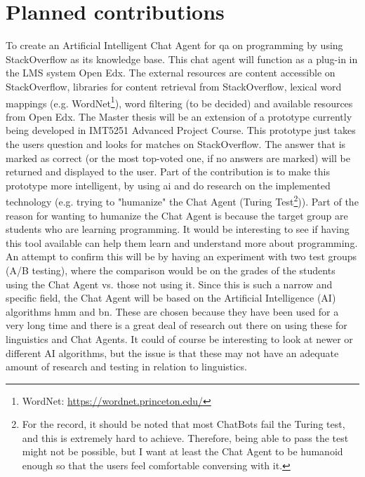 \section{Planned contributions}
\label{chapter2:planned_contribution}
To create an Artificial Intelligent Chat Agent for \gls{qa} on programming by using StackOverflow as its knowledge base. This chat agent will function as a plug-in in the LMS system 
Open Edx. The external resources are content accessible on StackOverflow, libraries for content retrieval from StackOverflow, lexical word mappings (e.g. WordNet\footnote{WordNet: 
\url{https://wordnet.princeton.edu/}}), word filtering (to be decided) and available resources from Open Edx.
\vspace{0.5em}\newline
The Master thesis will be an extension of a prototype currently being developed in IMT5251 Advanced Project Course. This prototype just takes the users question and looks for matches 
on StackOverflow. The answer that is marked as correct (or the most top-voted one, if no answers are marked) will be returned and displayed to the user. Part of the contribution is to 
make this prototype more intelligent, by using \gls{ai} and do research on the implemented technology (e.g. trying to "humanize" the Chat Agent (Turing Test\footnote{For the record, it 
should be noted that most ChatBots fail the Turing test, and this is extremely hard to achieve. Therefore, being able to pass the test might not be possible, but I want at least the 
Chat Agent to be humanoid enough so that the users feel comfortable conversing with it.})). Part of the reason for wanting to humanize the Chat Agent is because the target group are 
students who are learning programming. It would be interesting to see if having this tool available can help them learn and understand more about programming. An attempt to confirm 
this will be by having an experiment with two test groups (A/B testing), where the comparison would be on the grades of the students using the Chat Agent vs. those not using it. 
\vspace{0.5em}\newline
Since this is such a narrow and specific field, the Chat Agent will be based on the Artificial Intelligence (AI) algorithms  \gls{hmm} and 
\gls{bn}. These are chosen because they have been used for a very long time and there is a great deal of research out there on using these for linguistics and Chat Agents. It could 
of course be interesting to look at newer or different AI algorithms, but the issue is that these may not have an adequate amount of research and testing in relation to linguistics. 
